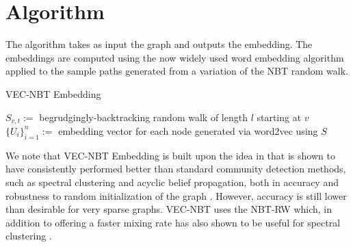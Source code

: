 \documentclass{article} %
\begin{document}
\section{Algorithm}
The algorithm takes as input the graph and outputs the embedding. The embeddings are computed using the now widely used word embedding algorithm \cite{word2vec} applied to the sample paths generated from a variation of the NBT random walk.
%

\begin{algorithm}
    \caption{VEC-NBT Embedding}
        {$S_{v,t} := $ begrudgingly-backtracking random walk of length $l$ starting at $v$}
    $\{U_i\}_{i=1}^{n} := $ embedding vector for each node generated via word2vec using $S$\\
\end{algorithm}

We note that VEC-NBT Embedding is built upon the idea in \cite{NodeEmbed} that is shown to have consistently performed better than standard community detection methods, such as spectral clustering and acyclic belief propagation, both in accuracy and robustness to random initialization of the graph \cite{NodeEmbed}. However, accuracy is still lower than desirable for very sparse graphs. VEC-NBT uses the NBT-RW which, in addition to offering a faster mixing rate \cite{Alon} has also shown to be useful for spectral clustering \cite{Redemption}.
\end{document}
